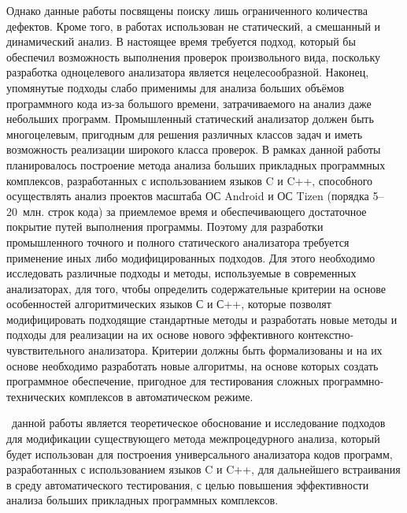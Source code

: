 Однако данные работы посвящены поиску лишь ограниченного количества дефектов. Кроме того, в работах использован не статический, а смешанный и динамический анализ. В настоящее время требуется подход, который бы обеспечил возможность выполнения проверок произвольного вида, поскольку разработка одноцелевого анализатора является нецелесообразной. Наконец, упомянутые подходы слабо применимы для анализа больших объёмов программного кода из-за большого времени, затрачиваемого на анализ даже небольших программ. Промышленный статический анализатор должен быть многоцелевым, пригодным для решения различных классов задач и иметь возможность реализации широкого класса проверок. В рамках данной работы планировалось построение метода анализа больших прикладных программных комплексов, разработанных с использованием языков C и C++, способного осуществлять анализ проектов масштаба ОС Android и ОС Tizen (порядка 5--20~млн. строк кода) за приемлемое время и обеспечивающего достаточное покрытие путей выполнения программы. Поэтому для разработки промышленного точного и полного статического анализатора требуется применение иных либо модифицированных подходов. Для этого необходимо исследовать различные подходы  и методы, используемые в современных анализаторах, для того, чтобы определить  содержательные критерии  на основе особенностей алгоритмических языков С и С++,
которые позволят модифицировать подходящие стандартные методы и разработать новые методы и подходы  для реализации на их основе нового эффективного  контекстно-чувствительного анализатора.  Критерии  должны быть формализованы и на их основе необходимо разработать новые алгоритмы, на основе которых создать программное обеспечение, пригодное  для тестирования  сложных программно-технических комплексов в автоматическом режиме.  

\aim\ данной работы является теоретическое обоснование и исследование подходов для модификации существующего метода межпроцедурного анализа, который будет использован для построения универсального анализатора кодов программ, разработанных с использованием языков C и C++, для дальнейшего встраивания в среду автоматического тестирования, с целью повышения эффективности анализа больших прикладных программных комплексов. %

